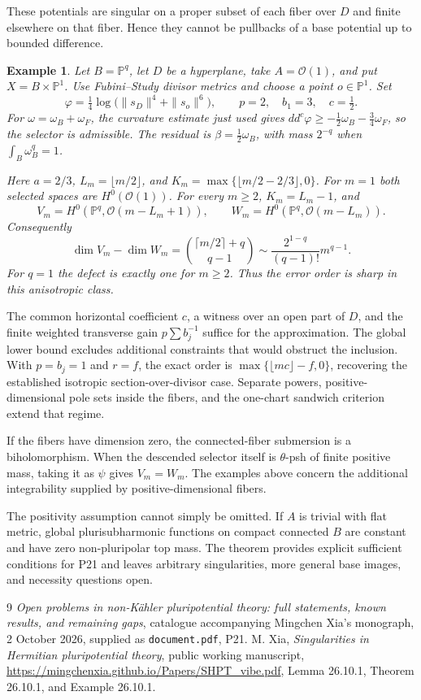 \documentclass[11pt]{article}
\newtheorem{example}{Example}
\newcommand{\ddc}{dd^c}
\newcommand{\cO}{\mathcal O}
\newcommand{\PP}{\mathbb P}
\begin{document}
These potentials are singular on a proper subset of each fiber over $D$ and
finite elsewhere on that fiber. Hence they cannot be pullbacks of a base
potential up to bounded difference.

\begin{example}\label{ex:explicit}
Let $B=\PP^q$, let $D$ be a hyperplane, take $A=\cO(1)$, and put
$X=B\times\PP^1$. Use Fubini--Study divisor metrics and choose a point
$o\in\PP^1$. Set
\[
 \varphi=\tfrac14\log\bigl(\|s_D\|^4+\|s_o\|^6\bigr),\qquad
 p=2,\quad b_1=3,\quad c=\tfrac12.
\]
For $\omega=\omega_B+\omega_F$, the curvature estimate just used gives
$\ddc\varphi\geq-\frac12\omega_B-\frac34\omega_F$, so the selector
is admissible. The residual is $\beta=\frac12\omega_B$, with mass $2^{-q}$
when $\int_B\omega_B^q=1$.

Here $a=2/3$, $L_m=\lfloor m/2\rfloor$, and
$K_m=\max\{\lfloor m/2-2/3\rfloor,0\}$. For $m=1$ both selected
spaces are $H^0(\cO(1))$. For every $m\geq2$, $K_m=L_m-1$, and
\[
 V_m=H^0(\PP^q,\cO(m-L_m+1)),\qquad
 W_m=H^0(\PP^q,\cO(m-L_m)).
\]
Consequently
\[
 \dim V_m-\dim W_m
 =\binom{\lceil m/2\rceil+q}{q-1}
 \sim\frac{2^{1-q}}{(q-1)!}m^{q-1}.
\]
For $q=1$ the defect is exactly one for $m\geq2$. Thus the error order
is sharp in this anisotropic class.
\end{example}

The common horizontal coefficient $c$, a witness over an open part of $D$,
and the finite weighted transverse gain $p\sum b_j^{-1}$ suffice for the
approximation. The global lower bound excludes additional constraints that
would obstruct the inclusion. With $p=b_j=1$ and $r=f$, the exact order is
$\max\{\lfloor mc\rfloor-f,0\}$, recovering the established isotropic
section-over-divisor case. Separate powers, positive-dimensional pole sets
inside the fibers, and the one-chart sandwich criterion extend that regime.

If the fibers have dimension zero, the connected-fiber submersion is a
biholomorphism. When the descended selector itself is $\theta$-psh of finite
positive mass, taking it as $\psi$ gives $V_m=W_m$. The examples above concern
the additional integrability supplied by positive-dimensional fibers.

The positivity assumption cannot simply be omitted. If $A$ is trivial with
flat metric, global plurisubharmonic functions on compact connected $B$
are constant and have zero non-pluripolar top mass. The theorem provides
explicit sufficient conditions for P21 and leaves arbitrary singularities,
more general base images, and necessity questions open.

\begin{thebibliography}{9}
\emph{Open problems in non-K\"ahler pluripotential theory: full statements,
known results, and remaining gaps}, catalogue accompanying Mingchen Xia's
monograph, 2 October 2026, supplied as \texttt{document.pdf}, P21.
M. Xia, \emph{Singularities in Hermitian pluripotential theory}, public
working manuscript, \url{https://mingchenxia.github.io/Papers/SHPT_vibe.pdf},
Lemma 26.10.1, Theorem 26.10.1, and Example 26.10.1.
\end{thebibliography}
\end{document}
